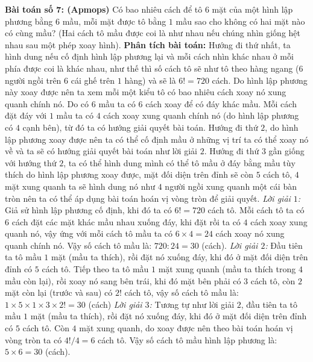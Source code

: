 \vskip 0.1cm
\textbf{\color{toancuabi}Bài toán số $\pmb{7}$: (Apmops)}
\vskip 0.1cm
Có bao nhiêu cách để tô $6$ mặt của một hình lập phương bằng $6$ mầu, mỗi mặt được tô bằng $1$ mầu sao cho không có hai mặt nào có cùng mầu? (Hai cách tô mầu được coi là như nhau nếu chúng nhìn giống hệt nhau sau một phép xoay hình). 
\vskip 0.1cm
\textbf{\color{toancuabi}Phân tích bài toán:} Hướng đi thứ nhất, ta hình dung nếu cố định hình lập phương lại và mỗi cách nhìn khác nhau ở mỗi phía được coi là khác nhau, như thế thì số cách tô sẽ như tô theo hàng ngang ($6$ người ngồi trên $6$ cái ghế trên $1$ hàng) và sẽ là $6!=720$ cách. Do hình lập phương này xoay được nên ta xem mỗi một kiểu tô có bao nhiêu cách xoay nó xung quanh chính nó. Do có $6$ mầu ta có $6$ cách xoay để có đáy khác mầu. Mỗi cách đặt đáy với $1$ mầu ta có $4$ cách xoay xung quanh chính nó (do hình lập phương có $4$ cạnh bên), từ đó ta có hướng giải quyết bài toán.
\vskip 0.1cm
Hướng đi thứ $2$, do hình lập phương xoay được nên ta có thể cố định mầu ở những vị trí ta có thể xoay nó về và ta sẽ có hướng giải quyết bài toán như lời giải $2$.
\vskip 0.1cm
Hướng đi thứ $3$ gần giống với hướng thứ $2$, ta có thể hình dung mình có thể tô mầu ở đáy bằng mầu tùy thích do hình lập phương xoay được, mặt đối diện trên đỉnh sẽ còn $5$ cách tô, $4$ mặt xung quanh ta sẽ hình dung nó như $4$ người ngồi xung quanh một cái bàn tròn nên ta có thể áp dụng bài toán hoán vị vòng tròn để giải quyết.
\vskip 0.1cm
\textit{Lời giải $1$:}
\vskip 0.1cm 
Giả sử hình lập phương cố định, khi đó ta có $6!=720$ cách tô.
\vskip 0.1cm
Mỗi cách tô ta có $6$ cách đặt các mặt khác mầu nhau xuống đáy, khi đặt rồi ta có $4$ cách xoay xung quanh nó, vậy ứng với mỗi cách tô mầu ta có $6\times4=24$ cách xoay nó xung quanh chính nó. Vậy số cách tô mầu là: $720:24=30$ (cách).
\vskip 0.1cm
\textit{Lời giải $2$:}
\vskip 0.1cm 
Đầu tiên ta tô mầu $1$ mặt (mầu ta thích), rồi đặt nó xuống đáy, khi đó ở mặt đối diện trên đỉnh có $5$ cách tô.
\vskip 0.1cm
Tiếp theo ta tô mầu $1$ mặt xung quanh (mầu ta thích trong $4$ mầu còn lại), rồi xoay nó sang bên trái, khi đó mặt bên phải có $3$ cách tô, còn $2$ mặt còn lại (trước và sau) có $2!$ cách tô, vậy số cách tô mầu là: $1\times5\times1\times3\times2!=30$ (cách)
\vskip 0.1cm
\textit{Lời giải $3$:}
\vskip 0.1cm
Tương tự như lời giải $2$, đầu tiên ta tô mầu $1$ mặt (mầu ta thích), rồi đặt nó xuống đáy, khi đó ở mặt đối diện trên đỉnh có $5$ cách tô.
\vskip 0.1cm
Còn $4$ mặt xung quanh, do xoay được nên theo bài toán hoán vị vòng tròn ta có $4!/4=6$ cách tô.
\vskip 0.1cm
Vậy số cách tô mầu hình lập phương là: $5\times 6=30$ (cách).
